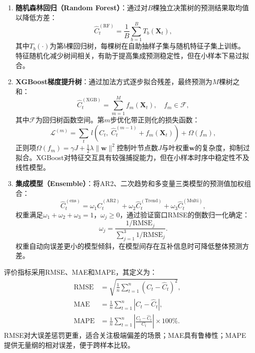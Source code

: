 \begin{enumerate}
\item {\songti\bfseries{}随机森林回归（Random Forest）}：通过对$B$棵独立决策树的预测结果取均值以降低方差：
\begin{equation}
\hat{C}_t^{(\mathrm{RF})} = \frac{1}{B}\sum_{b=1}^{B} T_b(\mathbf{X}_t),
\end{equation}
其中$T_b(\cdot)$为第$b$棵回归树，每棵树在自助抽样子集与随机特征子集上训练。特征随机化减少树间相关，有助于提高集成预测稳定性，但在小样本下易过拟合。

\item {\songti\bfseries{}XGBoost梯度提升树}：通过加法方式逐步拟合残差，最终预测为$M$棵树之和：
\begin{equation}
\hat{C}_t^{(\mathrm{XGB})} = \sum_{m=1}^{M} f_m(\mathbf{X}_t), \quad f_m \in \mathcal{F},
\end{equation}
其中$\mathcal{F}$为回归树函数空间。第$m$步优化带正则化的损失函数：
\begin{equation}
\mathcal{L}^{(m)} = \sum_{t}\, l\!\left(C_t,\;\hat{C}_t^{(m-1)}+f_m(\mathbf{X}_t)\right) + \Omega(f_m),
\end{equation}
正则项$\Omega(f_m)=\gamma J + \frac{1}{2}\lambda\|\mathbf{w}\|^2$控制叶节点数$J$与叶权重$\mathbf{w}$的复杂度，抑制过拟合。XGBoost对特征交互具有较强捕捉能力，但在小样本时序中稳定性不及线性模型。

\item {\songti\bfseries{}集成模型（Ensemble）}：将AR2、二次趋势和多变量三类模型的预测值加权组合：
\begin{equation}
\hat{C}_t^{(\mathrm{ens})} = \omega_1 \hat{C}_t^{(\mathrm{AR2})} + \omega_2 \hat{C}_t^{(\mathrm{Trend})} + \omega_3 \hat{C}_t^{(\mathrm{Multi})},
\end{equation}
权重满足$\omega_1+\omega_2+\omega_3=1$，$\omega_j\geq 0$，通过验证窗口RMSE的倒数归一化确定：
\begin{equation}
\omega_j = \frac{1/\mathrm{RMSE}_j}{\sum_{j=1}^{3}1/\mathrm{RMSE}_j}.
\end{equation}
权重自动向误差更小的模型倾斜，在模型间存在互补信息时可降低整体预测方差。

\end{enumerate}

评价指标采用RMSE、MAE和MAPE，其定义为：
\begin{align}
\mathrm{RMSE} &= \sqrt{\frac{1}{n}\sum_{t=1}^{n}(C_t-\hat{C}_t)^2}, \\[4pt]
\mathrm{MAE}  &= \frac{1}{n}\sum_{t=1}^{n}|C_t-\hat{C}_t|, \\[4pt]
\mathrm{MAPE} &= \frac{1}{n}\sum_{t=1}^{n}\left|\frac{C_t-\hat{C}_t}{C_t}\right|\times 100\%.
\end{align}
RMSE对大误差惩罚更重，适合关注极端偏差的场景；MAE具有鲁棒性；MAPE提供无量纲的相对误差，便于跨样本比较。

